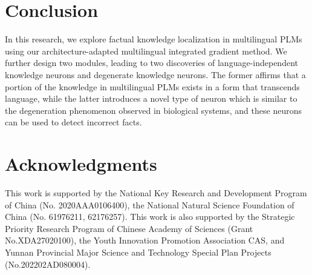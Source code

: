 \documentclass[]{article}
\begin{document}
\section{Conclusion}
In this research, we explore factual knowledge localization in multilingual PLMs using our architecture-adapted multilingual integrated gradient method. We further design two modules, leading to two discoveries of language-independent knowledge neurons and degenerate knowledge neurons. The former affirms that a portion of the knowledge in multilingual PLMs exists in a form that transcends language, while the latter introduces a novel type of neuron which is similar to the degeneration phenomenon observed in biological systems, and these neurons can be used to detect incorrect facts.

\section*{Acknowledgments}
This work is supported by the National Key Research and Development Program of China (No. 2020AAA0106400), the National Natural Science Foundation of China (No. 61976211, 62176257). This work is also supported by the Strategic Priority Research Program of Chinese Academy of Sciences (Grant No.XDA27020100), the Youth Innovation Promotion Association CAS, and Yunnan Provincial Major Science and Technology Special Plan Projects (No.202202AD080004).


\end{document}
